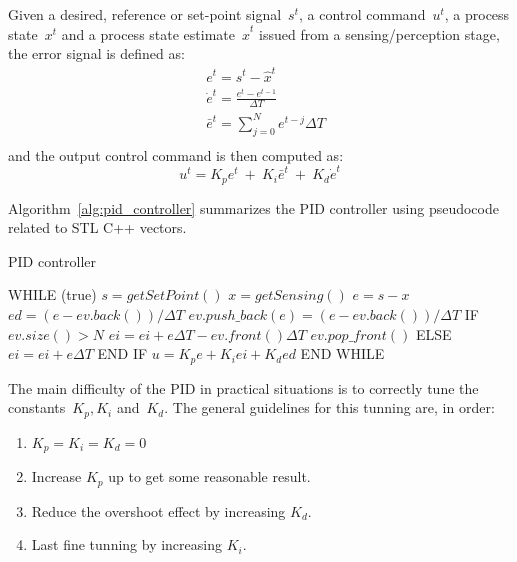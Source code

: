 Given a desired, reference or set-point signal~$s^t$, a control command~$u^t$, a process state~$x^t$ and a process state estimate~$\hat{x}^t$ issued from a sensing/perception stage, the error signal is defined as: 
\begin{align}
 & e^t = s^t - \hat{x}^t \\
 & \dot{e}^t = \frac{e^t-e^{t-1}}{\Delta T} \\
 & \bar{e}^t = \sum^N_{j=0} e^{t-j}\Delta T \\
\end{align}
and the output control command is then computed as: 
\begin{equation}
 u^t  = K_p e^t \ + \ K_i \bar{e}^t \ + \ K_d \dot{e}^t
\end{equation}

Algorithm~\ref{alg:pid_controller} summarizes the PID controller using pseudocode related to STL C++ vectors.  
\begin{algorithm}
\caption{PID controller}
\begin{algorithmic}
\STATE WHILE (true)
\STATE \hspace{0.5cm} $s=getSetPoint()$
\STATE \hspace{0.5cm} $x=getSensing()$
\STATE \hspace{0.5cm} $e = s-x$
\STATE \hspace{0.5cm} $ed = (e-ev.back())/\Delta T$
\STATE \hspace{0.5cm} $ev.push\_back(e) = (e-ev.back())/\Delta T$
\STATE \hspace{0.5cm} IF $ev.size()>N$
\STATE \hspace{1cm} $ei = ei+e\Delta T-ev.front()\Delta T $
\STATE \hspace{1cm} $ev.pop\_front()$
\STATE \hspace{0.5cm} ELSE
\STATE \hspace{1cm} $ei = ei+e\Delta T$
\STATE \hspace{0.5cm} END IF
\STATE \hspace{0.5cm} $u = K_p e + K_i ei + K_d ed$
\STATE END WHILE
\end{algorithmic}
\label{alg:pid_controller}
\end{algorithm}

The main difficulty of the PID in practical situations is to correctly tune the constants~$K_p, K_i$ and~$K_d$. The general guidelines for this tunning are, in order: 
\begin{enumerate}
	\item $K_p = K_i = K_d = 0$
	\item Increase $K_p$ up to get some reasonable result.
	\item Reduce the overshoot effect by increasing $K_d$.
	\item Last fine tunning by increasing $K_i$.
\end{enumerate}

